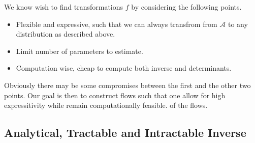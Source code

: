 We know wish to find transformations \(f\) by considering the following points.
\begin{itemize}
    \item Flexible and expressive, such that we can always transfrom from \(\mathcal{A}\) to any distribution as
        described above.
    \item Limit number of parameters to estimate.
    \item Computation wise, cheap to compute both inverse and determinants. 
\end{itemize}
Obviously there may be some compromises between the first and the other two points. Our goal is then
to construct flows such that one allow for high expressitivity while remain computationally feasible.
of the flows. 

\subsection{Analytical, Tractable and Intractable Inverse}




